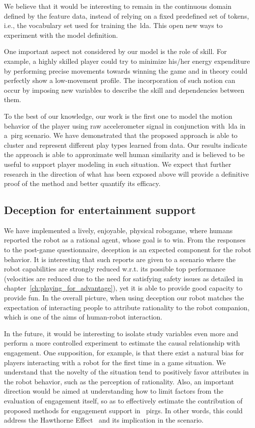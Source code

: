 We believe that it would be interesting to remain in the continuous domain defined by the feature data, instead of relying on a fixed predefined set of tokens, i.e., the vocabulary set used for training the~\gls{lda}. This open new ways to experiment with the model definition.

One important aspect not considered by our model is the role of skill. For example, a highly skilled player could try to minimize his/her energy expenditure by performing precise movements towards winning the game and in theory could perfectly show a low-movement profile.  The incorporation of such notion can occur by imposing new variables to describe the skill and dependencies between them. 

To the best of our knowledge, our work is the first one to model the motion behavior of the player using raw accelerometer signal in conjunction with~\gls{lda} in a~\gls{pirg} scenario. We have demonstrated that the proposed approach is able to cluster and represent different play types learned from data. Our results indicate the approach is able to approximate well human similarity and is believed to be useful to support player modeling in such situation. We expect that further research in the direction of what has been exposed above will provide a definitive proof of the method and better quantify its efficacy. 

\subsection{Deception for entertainment support}
We have implemented a lively, enjoyable, physical robogame, where humans reported the robot as a rational agent, whose goal is to win. From the responses to the post-game questionnaire, deception is an expected component for the robot behavior. It is interesting that such reports are given to a scenario where the robot capabilities are strongly reduced w.r.t. its possible top performance (\eg velocities are reduced due to the need for satisfying safety issues as detailed in chapter~\ref{ch:playing_for_advantage}), yet it is able to provide good capacity to provide fun. In the overall picture, when using deception our robot matches the expectation of interacting people to attribute rationality to the robot companion, which is one of the aims of human-robot interaction.

In the future, it would be interesting to isolate study variables even more and perform a more controlled experiment to estimate the causal relationship with engagement. One supposition, for example, is that there exist a natural bias for players interacting with a robot for the first time in a game situation. We understand that the novelty of the situation tend to positively favor attributes in the robot behavior, such as the perception of rationality. Also, an important direction would be aimed at understanding how to limit factors from the evaluation of engagement itself, so as to effectively estimate the contribution of proposed methods for engagement support in ~\gls{pirg}s. In other words, this could address the Hawthorne Effect~\citep{jones_was_1992} and its implication in the scenario.

